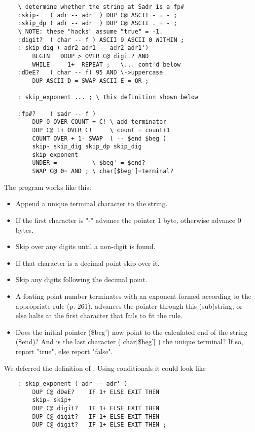 \begin{lstlisting}
    \ determine whether the string at Sadr is a fp#
    :skip-   ( adr -- adr' ) DUP C@ ASCII - = - ;
    :skip_dp ( adr -- adr' ) DUP C@ ASCII . = - ;
    \ NOTE: these "hacks" assume "true" = -1.
    :digit?  ( char -- f ) ASCII 9 ASCII 0 WITHIN ;
    : skip_dig ( adr2 adr1 -- adr2 adr1')
        BEGIN   DDUP > OVER C@ digit? AND
        WHILE     1+  REPEAT ;   \... cont'd below
    :dDeE?   ( char -- f) 95 AND \->uppercase
        DUP ASCII D = SWAP ASCII E = OR ;

    : skip_exponent ... ; \ this definition shown below

    :fp#?    ( $adr -- f )
        DUP 0 OVER COUNT + C! \ add terminator
        DUP C@ 1+ OVER C!     \ count = count+1
        COUNT OVER + 1- SWAP  ( -- $end $beg )
        skip- skip_dig skip_dp skip_dig
        skip_exponent
        UNDER =          \ $beg' = $end?
        SWAP C@ 0= AND ; \ char[$beg']=terminal?
\end{lstlisting}

The program works like this:

\begin{itemize}
    \item Append a unique terminal character to the string.
    \item If the first character is "-" advance the pointer 1 byte, otherwise advance 0 bytes.
    \item Skip over any digits until a non-digit is found.
    \item If that character is a decimal point skip over it.
    \item Skip any digits following the decimal point.
    \item A foating point number terminates with an exponent formed according to the appropriate rule (p. 261).  advances the pointer through this (sub)string, or else halts at the first character that fails to fit the rule.
    \item Does the initial pointer (\$beg') now point to the calculated end of the string (\$end)? And is the last character ( char[\$beg'] ) the unique terminal? If so, report "true", else report "false".
\end{itemize}

We deferred the definition of . Using conditionals it could look like

\begin{lstlisting}
    : skip_exponent ( adr -- adr' )
        DUP C@ dDeE?    IF 1+ ELSE EXIT THEN
        skip- skip+
        DUP C@ digit?   IF 1+ ELSE EXIT THEN
        DUP C@ digit?   IF 1+ ELSE EXIT THEN
        DUP C@ digit?   IF 1+ ELSE EXIT THEN ;
\end{lstlisting}

